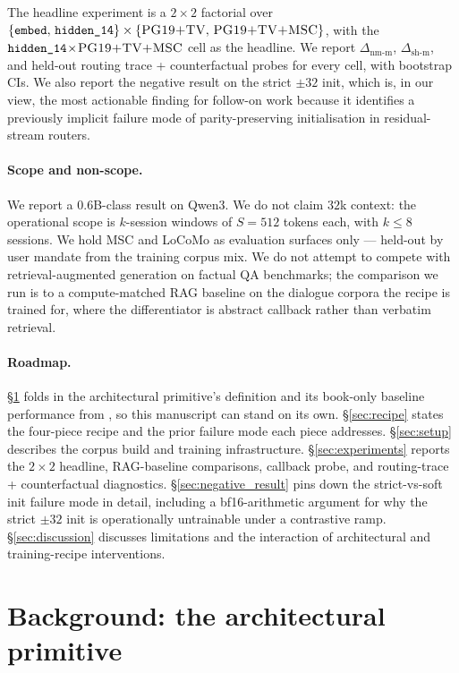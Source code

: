 \documentclass{article}
\newcommand{\dnm}{\Delta_{\text{nm-m}}}
\newcommand{\dsh}{\Delta_{\text{sh-m}}}
\begin{document}
The headline experiment is a $2\!\times\!2$ factorial over
$\{\texttt{embed},\,\texttt{hidden\_14}\}\times\{\textsc{PG19+TV},\,
\textsc{PG19+TV+MSC}\}$, with the $\texttt{hidden\_14}\!\times\!\textsc{PG19+TV+MSC}$
cell as the headline. We report $\dnm$, $\dsh$, and held-out routing
trace + counterfactual probes for every cell, with bootstrap CIs.
We also report the negative result on the strict $\pm 32$ init,
which is, in our view, the most actionable finding for follow-on
work because it identifies a previously implicit failure mode of
parity-preserving initialisation in residual-stream routers.

\paragraph{Scope and non-scope.} We report a $0.6$B-class result
on Qwen3. We do not claim $32$k context: the operational scope is
$k$-session windows of $S{=}512$ tokens each, with $k\!\le\!8$
sessions. We hold MSC and LoCoMo as evaluation surfaces only ---
held-out by user mandate from the training corpus mix. We do not
attempt to compete with retrieval-augmented generation on factual
$\mathrm{QA}$ benchmarks; the comparison we run is to a
compute-matched RAG baseline on the dialogue corpora the recipe is
trained for, where the differentiator is abstract callback rather
than verbatim retrieval.

\paragraph{Roadmap.} \S\ref{sec:primitive} folds in the
architectural primitive's definition and its book-only baseline
performance from \cite{liu2025drop}, so this manuscript can stand
on its own. \S\ref{sec:recipe} states the four-piece recipe and
the prior failure mode each piece addresses. \S\ref{sec:setup}
describes the corpus build and training infrastructure.
\S\ref{sec:experiments} reports the $2\!\times\!2$ headline,
RAG-baseline comparisons, callback probe, and routing-trace +
counterfactual diagnostics. \S\ref{sec:negative_result} pins down
the strict-vs-soft init failure mode in detail, including a
bf16-arithmetic argument for why the strict $\pm 32$ init is
operationally untrainable under a contrastive ramp.
\S\ref{sec:discussion} discusses limitations and the interaction
of architectural and training-recipe interventions.

\section{Background: the architectural primitive}
\label{sec:primitive}
\end{document}
